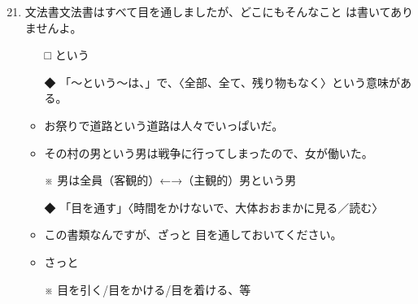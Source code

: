 \documentclass[
uplatex,
b5paper,
10pt,
dvipdfmx
]{jsbook}
\begin{document}

\begin{enumerate}
\setcounter{enumi}{20}
 \item 文法書\underline{\hspace{3zw}}文法書はすべて目を通しましたが、どこにもそんなこと
       は書いてありませんよ。
\begin{itemize}
 \item[□] という
 \item[◆] 「〜という〜は、」で、〈全部、全て、残り物もなく〉という意味がある。
\end{itemize}
\begin{itemize}
 \item お祭りで道路という道路は人々でいっぱいだ。
 \item その村の男という男は戦争に行ってしまったので、女が働いた。
 \item[※] 男は全員（客観的）←→（主観的）男という男
\end{itemize}
\begin{itemize}
 \item[◆] 「目を通す」〈時間をかけないで、大体おおまかに見る／読む〉
\end{itemize}
\begin{itemize}
 \item この書類なんですが、ざっと 目を通しておいてください。 
 \item           さっと
 \item[※] 目を引く/目をかける/目を着ける、等
\end{itemize}


\end{enumerate}
\end{document}
